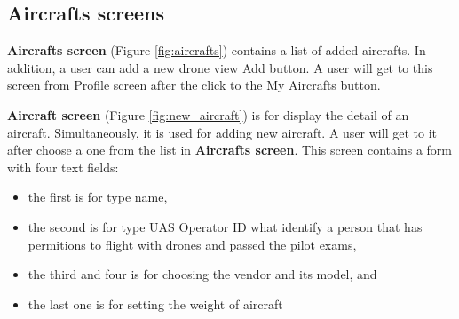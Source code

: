 \subsection{Aircrafts screens}\label{subsec:aircrafts-screens}
\textbf{Aircrafts screen} (Figure \ref{fig:aircrafts}) contains a list of added aircrafts.
In addition, a user can add a new drone view Add button.
A user will get to this screen from Profile screen after the click to the My Aircrafts button.

\textbf{Aircraft screen} (Figure \ref{fig:new_aircraft}) is for display the detail of an aircraft.
Simultaneously, it is used for adding new aircraft.
A user will get to it after choose a one from the list in \textbf{Aircrafts screen}.
This screen contains a form with four text fields:
\begin{itemize}
    \item the first is for type name,
    \item the second is for type UAS Operator ID what identify a person that has permitions to flight with drones and passed the pilot exams,
    \item the third and four is for choosing the vendor and its model, and
    \item the last one is for setting the weight of aircraft
\end{itemize}


